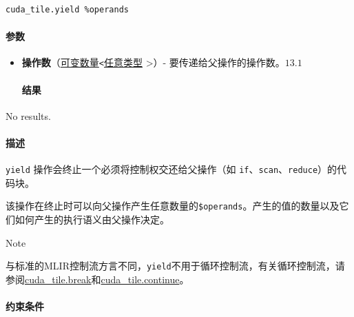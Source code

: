 \documentclass{article}
\begin{document}
\begin{lstlisting}
cuda_tile.yield %operands
\end{lstlisting}

\paragraph{参数}

\begin{itemize}
\item \textbf{操作数}（\href{https://docs.nvidia.com/cuda/tile-ir/latest/sections/operations.html#type-variadic}{可变数量}\texttt{<}\href{https://docs.nvidia.com/cuda/tile-ir/latest/sections/operations.html#type-any}{任意类型} >）- 要传递给父操作的操作数。$\boxed{13.1}$


\paragraph{结果}

\end{itemize}
No results.



\paragraph{描述}

\texttt{yield} 操作会终止一个必须将控制权交还给父操作（如 \texttt{if}、\texttt{scan}、\texttt{reduce}）的代码块。


该操作在终止时可以向父操作产生任意数量的\texttt{\$operands}。产生的值的数量以及它们如何产生的执行语义由父操作决定。


Note


与标准的MLIR控制流方言不同，\texttt{yield}不用于循环控制流，有关循环控制流，请参阅\href{https://docs.nvidia.com/cuda/tile-ir/latest/sections/operations.html#op-cuda-tile-break}{cuda\_tile.break}和\href{https://docs.nvidia.com/cuda/tile-ir/latest/sections/operations.html#op-cuda-tile-continue}{cuda\_tile.continue}。



\paragraph{约束条件}
\end{document}

